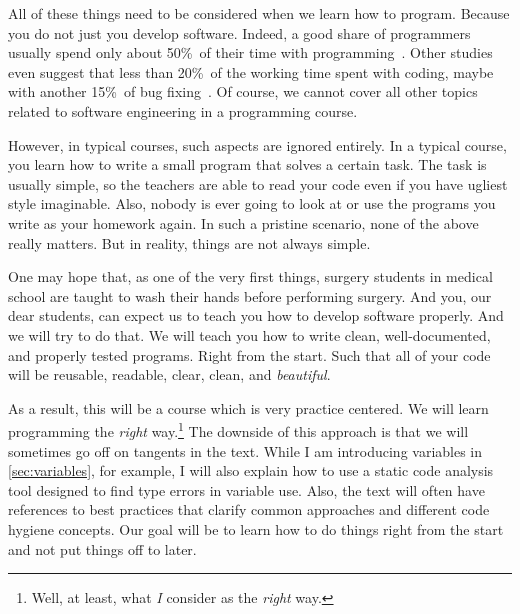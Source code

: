 All of these things need to be considered when we learn how to program.
Because you do not just  you develop software.
Indeed, a good share of programmers usually spend only about 50\%~of their time with programming~\cite{T2019MOSWBFDHOT2TMOSS,AS2019DS2OSRP}.
Other studies even suggest that less than 20\%~of the working time spent with coding, maybe with another 15\%~of bug fixing~\cite{MAGTOC2024EHFAP}.
Of course, we cannot cover all other topics related to software engineering in a programming course.

However, in typical courses, such aspects are ignored entirely.
In a typical course, you learn how to write a small program that solves a certain task.
The task is usually simple, so the teachers are able to read your code even if you have ugliest style imaginable.
Also, nobody is ever going to look at or use the programs you write as your homework again.
In such a pristine scenario, none of the above really matters.
But in reality, things are not always simple.

One may hope that, as one of the very first things, surgery students in medical school are taught to wash their hands before performing surgery.
And you, our dear students, can expect us to teach you how to develop software properly.
And we will try to do that.
We will teach you how to write clean, well-documented, and properly tested programs.
Right from the start.
Such that all of your code will be reusable, readable, clear, clean, and \emph{beautiful}.

As a result, this will be a course which is very practice centered.
We will learn programming the \emph{right} way.\footnote{%
Well, at least, what \emph{I} consider as the \emph{right} way.%
}
The downside of this approach is that we will sometimes go off on tangents in the text.
While I am introducing variables in \cref{sec:variables}, for example, I will also explain how to use a static code analysis tool designed to find type errors in variable use.
Also, the text will often have references to best practices that clarify common approaches and different code hygiene concepts.
Our goal will be to learn how to do things right from the start and not put things off to later.%
%
\endhsection%
%
